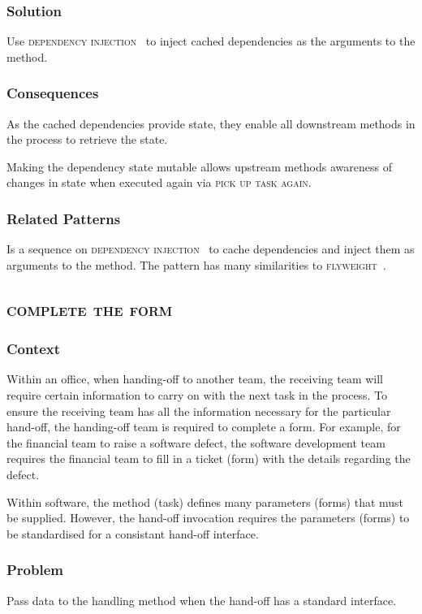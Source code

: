 \documentclass[prodmode]{style/acmlarge}
\begin{document}
\subsubsection*{Solution} Use \textsc{dependency injection}~\cite{ioc} to inject
cached dependencies as the arguments to the method.

\subsubsection*{Consequences} As the cached dependencies provide state, they
enable all downstream methods in the process to retrieve the state.

Making the dependency state mutable allows upstream methods awareness of changes
in state when executed again via \textsc{pick up task again}.

\subsubsection*{Related Patterns} Is a sequence on \textsc{dependency
injection}~\cite{ioc} to cache dependencies and inject them as arguments to the
method.  The pattern has many similarities to \textsc{flyweight}~\cite{gof}.



\subsection{\textsc{\textbf{complete the form}}}

\subsubsection*{Context} Within an office, when handing-off to another team, the
receiving team will require certain information to carry on with the next task
in the process.  To ensure the receiving team has all the information necessary
for the particular hand-off, the handing-off team is required to complete a
form.  For example, for the financial team to raise a software defect, the
software development team requires the financial team to fill in a ticket (form)
with the details regarding the defect.

Within software, the method (task) defines many parameters (forms) that must be
supplied.  However, the hand-off invocation requires the parameters (forms) to
be standardised for a consistant hand-off interface.

\subsubsection*{Problem} Pass data to the handling method when the hand-off has
a standard interface.
\end{document}
